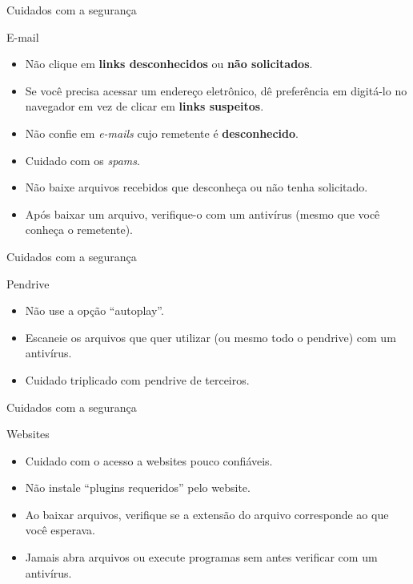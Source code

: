 \begin{frame}{Cuidados com a segurança}
	\begin{block}{E-mail}
		\begin{itemize}
			\item Não clique em \textbf{links desconhecidos} ou \textbf{não solicitados}.
			\item Se você precisa acessar um endereço eletrônico, dê preferência em digitá-lo no navegador em vez de clicar em \textbf{links suspeitos}.
			\item Não confie em \textit{e-mails} cujo remetente é \textbf{desconhecido}.
			\item Cuidado com os \textit{spams}.
			\item Não baixe arquivos recebidos que desconheça ou não tenha solicitado.
			\item Após baixar um arquivo, verifique-o com um antivírus (mesmo que você conheça o remetente).
		\end{itemize}
	\end{block}
\end{frame}


\begin{frame}{Cuidados com a segurança}
	\begin{block}{Pendrive}
		\begin{itemize}
			\item Não use a opção “autoplay”.
			\item Escaneie os arquivos que quer utilizar (ou mesmo todo o pendrive) com um antivírus.
			\item Cuidado triplicado com pendrive de terceiros.
		\end{itemize}
	\end{block}
\end{frame}


\begin{frame}{Cuidados com a segurança}
	\begin{block}{Websites}
		\begin{itemize}
			\item Cuidado com o acesso a websites pouco confiáveis.
			\item Não instale “plugins requeridos” pelo website.
			\item Ao baixar arquivos, verifique se a extensão do arquivo corresponde ao que você esperava.
			\item Jamais abra arquivos ou execute programas sem antes verificar com um antivírus.
		\end{itemize}
	\end{block}
\end{frame}


